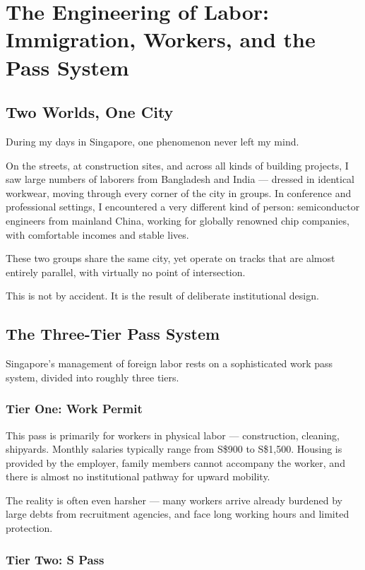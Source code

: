 \chapter{The Engineering of Labor: Immigration, Workers, and the Pass System}

\section{Two Worlds, One City}

During my days in Singapore, one phenomenon never left my mind.

On the streets, at construction sites, and across all kinds of building projects, I saw large numbers of laborers from Bangladesh and India --- dressed in identical workwear, moving through every corner of the city in groups. In conference and professional settings, I encountered a very different kind of person: semiconductor engineers from mainland China, working for globally renowned chip companies, with comfortable incomes and stable lives.

These two groups share the same city, yet operate on tracks that are almost entirely parallel, with virtually no point of intersection.

This is not by accident. It is the result of deliberate institutional design.

\section{The Three-Tier Pass System}

Singapore's management of foreign labor rests on a sophisticated work pass system, divided into roughly three tiers.

\subsection*{Tier One: Work Permit}

This pass is primarily for workers in physical labor --- construction, cleaning, shipyards. Monthly salaries typically range from S\$900 to S\$1,500. Housing is provided by the employer, family members cannot accompany the worker, and there is almost no institutional pathway for upward mobility.

The reality is often even harsher --- many workers arrive already burdened by large debts from recruitment agencies, and face long working hours and limited protection.

\subsection*{Tier Two: S Pass}

